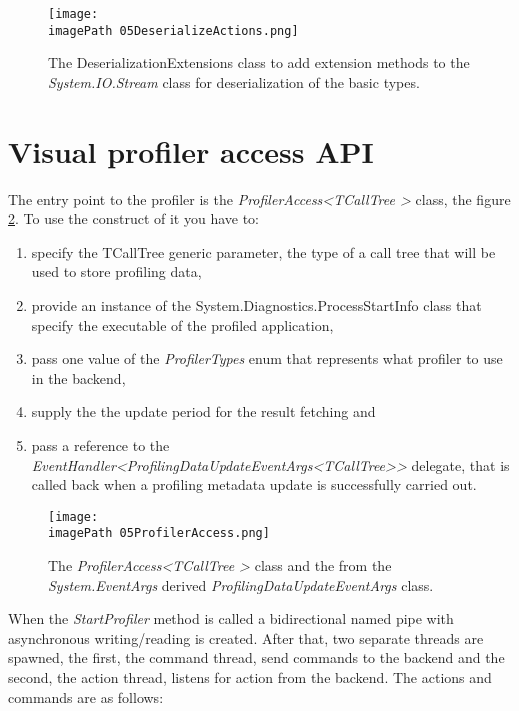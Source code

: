 \begin{figure}
	\centering
		\texttt{[image: \\imagePath 05DeserializeActions.png]}
		\caption{The DeserializationExtensions class to add extension methods to the \textit{System.IO.Stream} class for deserialization of the basic types. }
	\label{fig:05DeserializeActions}
\end{figure}

\section{Visual profiler access API}
The entry point to the profiler is the \textit{ProfilerAccess\textless TCallTree \textgreater} class, the figure \ref{fig:05ProfilerAccess}. To use the construct of it you have to:
\begin{enumerate}

\item specify the TCallTree generic parameter, the type of a call tree that will be used to store profiling data,

\item provide an instance of the System.Diagnostics.ProcessStartInfo class that specify the executable of the profiled application,

\item pass one value of the \textit{ProfilerTypes} enum that represents what profiler to use in the backend,

\item supply the the update period for the result fetching and

\item pass a reference to the \textit{EventHandler\textless ProfilingDataUpdateEventArgs\textless TCallTree\textgreater\textgreater} delegate, that is called back when a profiling metadata update is successfully carried out.
 
\end{enumerate}
\begin{figure}
	\centering
		\texttt{[image: \\imagePath 05ProfilerAccess.png]}
		\caption{The \textit{ProfilerAccess\textless TCallTree \textgreater} class and the from the \textit{System.EventArgs} derived \textit{ProfilingDataUpdateEventArgs} class. }
	\label{fig:05ProfilerAccess}
\end{figure}

When the \textit{StartProfiler} method is called a bidirectional named pipe with asynchronous writing/reading is created. After that, two separate threads are spawned, the first, the command thread, send commands to the backend and the second, the action thread, listens for action from the backend. The actions and commands are as follows:

